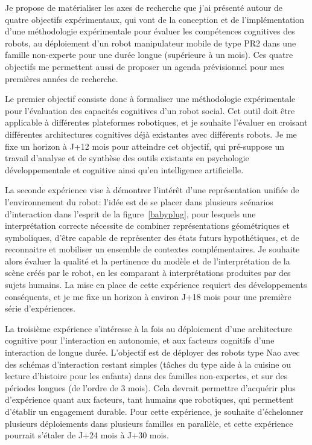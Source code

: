 \documentclass[a4paper]{article}
\begin{document}
Je propose de matérialiser les axes de recherche que j'ai présenté autour de
quatre objectifs expérimentaux, qui vont de la conception et de
l'implémentation d'une méthodologie expérimentale pour évaluer les compétences
cognitives des robots, au déploiement d'un robot manipulateur mobile de type
PR2 dans une famille non-experte pour une durée longue (supérieure à un mois).
Ces quatre objectifs me permettent aussi de proposer un agenda prévisionnel
pour mes premières années de recherche.

Le premier objectif consiste donc à formaliser une méthodologie expérimentale
pour l'évaluation des capacités cognitives d'un robot social. Cet outil doit
être applicable à différentes plateformes robotiques, et je souhaite l'évaluer
en croisant différentes architectures cognitives déjà existantes avec différents
robots.  Je me fixe un horizon à J+12 mois pour atteindre cet objectif, qui
pré-suppose un travail d'analyse et de synthèse des outils existants en
psychologie développementale et cognitive ainsi qu'en intelligence
artificielle.

La seconde expérience vise à démontrer l'intérêt d'une représentation unifiée de
l'environnement du robot: l'idée est de se placer dans plusieurs scénarios
d'interaction dans l'esprit de la figure~\ref{babyplug}, pour lesquels une
interprétation correcte nécessite de combiner représentations géométriques et
symboliques, d'être capable de représenter des états futurs hypothétiques, et de
reconnaitre et mobiliser un ensemble de contextes complémentaires. Je souhaite
alors évaluer la qualité et la pertinence du modèle et de l'interprétation de la
scène créés par le robot, en les comparant à interprétations produites par des
sujets humains. La mise en place de cette expérience requiert des développements
conséquents, et je me fixe un horizon à environ J+18 mois pour une première
série d'expériences.

La troisième expérience s'intéresse à la fois au déploiement d'une architecture
cognitive pour l'interaction en autonomie, et aux facteurs cognitifs d'une
interaction de longue durée. L'objectif est de déployer des robots type Nao avec
des schémas d'interaction restant simples (tâches du type aide à la cuisine ou
lecture d'histoire pour les enfants) dans des familles non-expertes, et sur des
périodes longues (de l'ordre de 3 mois). Cela devrait permettre d'acquérir plus
d'expérience quant aux facteurs, tant humains que robotiques, qui permettent
d'établir un engagement durable.  Pour cette expérience, je souhaite
d'échelonner plusieurs déploiements dans plusieurs familles en parallèle, et
cette expérience pourrait s'étaler de J+24 mois à J+30 mois.
\end{document}
